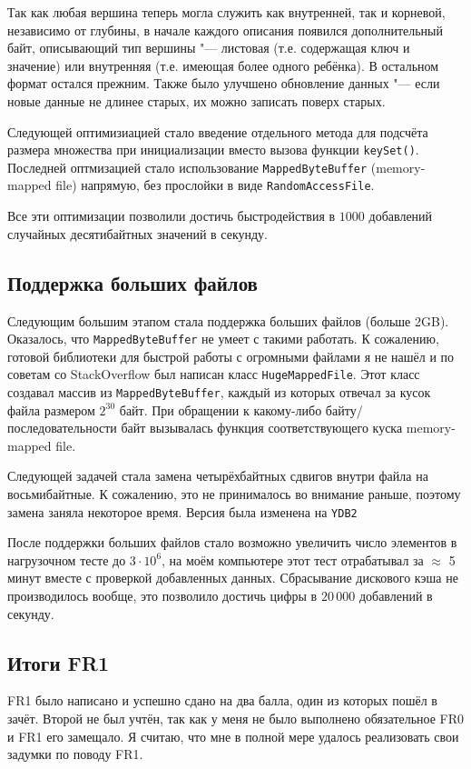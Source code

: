 \documentclass[a4paper]{article}
\renewcommand{\t}{\texttt}
\begin{document}
  Так как любая вершина теперь могла служить как внутренней, так и корневой, независимо от глубины,
  в начале каждого описания появился дополнительный байт, описывающий тип вершины "--- листовая (т.е.
  содержащая ключ и значение) или внутренняя (т.е. имеющая более одного ребёнка). В остальном формат
  остался прежним. Также было улучшено обновление данных "--- если новые данные не длинее старых, их
  можно записать поверх старых.

  Следующей оптимизиацией стало введение отдельного метода для подсчёта размера множества при инициализации
  вместо вызова функции \t{keySet()}. Последней оптмизацией стало использование \t{MappedByteBuffer} (memory-mapped file) напрямую, без
  прослойки в виде \t{RandomAccessFile}.

  Все эти оптимизации позволили достичь быстродействия в $1000$ добавлений случайных десятибайтных
  значений в секунду.

\subsection{Поддержка больших файлов}
  Следующим большим этапом стала поддержка больших файлов (больше 2GB). Оказалось, что
  \t{MappedByteBuffer} не умеет с такими работать. К сожалению, готовой библиотеки для быстрой
  работы с огромными файлами я не нашёл и по советам со StackOverflow был написан класс \t{HugeMappedFile}.
  Этот класс создавал массив из \t{MappedByteBuffer}, каждый из которых отвечал за кусок файла размером $2^{30}$
  байт. При обращении к какому-либо байту/последовательности байт вызывалась функция соответствующего куска
  memory-mapped file.

  Следующей задачей стала замена четырёхбайтных сдвигов внутри файла на восьмибайтные. К сожалению, это
  не принималось во внимание раньше, поэтому замена заняла некоторое время. Версия была изменена на
  \t{YDB2}

  После поддержки больших файлов стало возможно увеличить число элементов в нагрузочном тесте до $3\cdot10^6$,
  на моём компьютере этот тест отрабатывал за $\approx$ 5 минут вместе с проверкой добавленных данных.
  Сбрасывание дискового кэша не производилось вообще, это позволило достичь цифры в $20\,000$ добавлений в секунду.

\subsection{Итоги FR1}
  FR1 было написано и успешно сдано на два балла, один из которых пошёл в зачёт. Второй не был учтён, так как
  у меня не было выполнено обязательное FR0 и FR1 его замещало. Я считаю, что мне в полной мере удалось
  реализовать свои задумки по поводу FR1.
\end{document}

